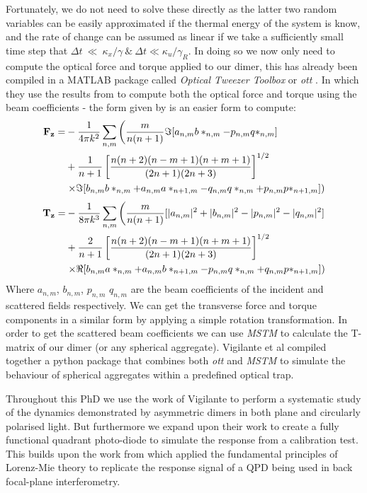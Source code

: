 Fortunately, we do not need to solve these directly as the latter two random variables can be easily approximated if the thermal energy of the system is know, and the rate of change can be assumed as linear if we take a sufficiently small time step that $\Delta t~\ll~\kappa_x/\gamma \ \& \ \Delta t \ll \kappa_u/\gamma_R$. In doing so we now only need to compute the optical force and torque applied to our dimer, this has already been compiled in a MATLAB package called \textit{Optical Tweezer Toolbox} or \textit{ott} \cite{Nieminen2007}. In which they use the results from \cite{Farsund1996} to compute both the optical force and torque using the beam coefficients - the form given by \cite{Crichton2000THEMD} is an easier form to compute: 
\begin{equation}
\begin{split}
	\bold{F_z}=&-\frac{1}{4\pi k^2}\sum_{n,m} \left(\frac{m}{n(n+1)}\Im[a_{n,m}b*_{n,m}-p_{n,m}q*_{n,m}] \right. \\ 
	&+\frac{1}{n+1}\left[\frac{n(n+2)(n-m+1)(n+m+1)}{(2n+1)(2n+3)} \right]^{1/2}  \\
	& \left. \times \Im[b_{n,m}b*_{n,m}+a_{n,m}a*_{n+1,m} - q_{n,m}q*_{n,m}+p_{n,m}p*_{n+1,m}] \right)
\end{split}
\end{equation}
\begin{equation}
\begin{split}
	\bold{T_z}=&-\frac{1}{8\pi k^3}\sum_{n,m} \left(\frac{m}{n(n+1)}[|a_{n,m}|^2+|b_{n,m}|^2-|p_{n,m}|^2-|q_{n,m}|^2] \right. \\ 
	&+\frac{2}{n+1}\left[\frac{n(n+2)(n-m+1)(n+m+1)}{(2n+1)(2n+3)} \right]^{1/2}  \\
	& \left. \times \Re[b_{n,m}a*_{n,m}+a_{n,m}b*_{n+1,m} - p_{n,m}q*_{n,m}+q_{n,m}p*_{n+1,m}] \right)
\end{split}
\end{equation}
Where $a_{n,m}$, $b_{n,m}$, $p_{n,m}$ $q_{n,m}$ are the beam coefficients of the incident and scattered fields respectively. We can get the transverse force and torque components in a similar form by applying a simple rotation transformation. In order to get the scattered beam coefficients we can use \textit{MSTM} \cite{Mackowski2011} to calculate the T-matrix of our dimer (or any spherical aggregate). Vigilante et al compiled together a python package that combines both \textit{ott} and \textit{MSTM} to simulate the behaviour of spherical aggregates within a predefined optical trap. 

Throughout this PhD we use the work of Vigilante to perform a systematic study of the dynamics demonstrated by asymmetric dimers in both plane and circularly polarised light. But furthermore we expand upon their work to create a fully functional quadrant photo-diode to simulate the response from a calibration test. This builds upon the work from \cite{Rohrbach2002} which applied the fundamental principles of Lorenz-Mie theory to replicate the response signal of a QPD being used in back focal-plane interferometry.

